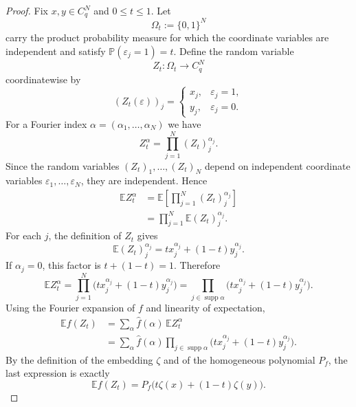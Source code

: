 \documentclass[11pt,a4paper]{article}
\numberwithin{equation}{section}
\theoremstyle{cleanplain}
\theoremstyle{cleandefinition}
\theoremstyle{cleanremark}
\newcommand{\E}{\mathbb E}
\newcommand{\supp}{\operatorname{supp}}
\begin{document}
\begin{proof}
Fix $x,y\in C_q^N$ and $0\leq t\leq1$.  Let
\[
 \Omega_t:=\{0,1\}^N
\]
carry the product probability measure for which the coordinate variables
are independent and satisfy $\mathbb P(\varepsilon_j=1)=t$.  Define the
random variable
\[
 Z_t:\Omega_t\longrightarrow C_q^N
\]
coordinatewise by
\[
 (Z_t(\varepsilon))_j=
 \begin{cases}
 x_j,&\varepsilon_j=1,\\
 y_j,&\varepsilon_j=0.
 \end{cases}
\]
{\color{black}
For a Fourier index $\alpha=(\alpha_1,\ldots,\alpha_N)$ we have
\[
 Z_t^\alpha=\prod_{j=1}^N (Z_t)_j^{\alpha_j}.
\]
Since the random variables $(Z_t)_1,\ldots,(Z_t)_N$ depend on independent
coordinate variables $\varepsilon_1,\ldots,\varepsilon_N$, they are
independent.  Hence
\begin{align*}
 \E Z_t^\alpha
 &=\E\!\left[\prod_{j=1}^N (Z_t)_j^{\alpha_j}\right]\\
 &=\prod_{j=1}^N \E (Z_t)_j^{\alpha_j}.
\end{align*}
For each $j$, the definition of $Z_t$ gives
\[
 \E (Z_t)_j^{\alpha_j}
 =t x_j^{\alpha_j}+(1-t)y_j^{\alpha_j}.
\]
If $\alpha_j=0$, this factor is $t+(1-t)=1$.  Therefore
\begin{equation}\label{eq:expectation-character}
 \E Z_t^\alpha
 =\prod_{j=1}^N
 \bigl(t x_j^{\alpha_j}+(1-t)y_j^{\alpha_j}\bigr)
 =\prod_{j\in\supp\alpha}
 \bigl(t x_j^{\alpha_j}+(1-t)y_j^{\alpha_j}\bigr).
\end{equation}
Using the Fourier expansion of $f$ and linearity of expectation,
\begin{align*}
 \E f(Z_t)
 &=\sum_\alpha \widehat f(\alpha)\,\E Z_t^\alpha\\
 &=\sum_\alpha \widehat f(\alpha)
   \prod_{j\in\supp\alpha}
   \bigl(t x_j^{\alpha_j}+(1-t)y_j^{\alpha_j}\bigr).
\end{align*}
By the definition of the embedding $\zeta$ and of the homogeneous polynomial
$P_f$, the last expression is exactly
\begin{equation}\label{eq:expectation-Pf}
 \E f(Z_t)=P_f\bigl(t\zeta(x)+(1-t)\zeta(y)\bigr).
\end{equation}
}


\end{proof}
\end{document}
